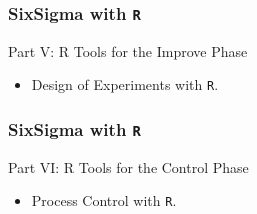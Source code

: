 \documentclass{beamer}
\begin{document}
\begin{frame}
\frametitle{SixSigma with \texttt{R}}
\Large
Part V: R Tools for the Improve Phase

\begin{itemize}
\item  Design of Experiments with \texttt{R}. 
\end{itemize}

\end{frame}
\begin{frame}
\frametitle{SixSigma with \texttt{R}}
\Large
Part VI: R Tools for the Control Phase

\begin{itemize}
\item  Process Control with \texttt{R}.
\end{itemize} 
\end{frame}
\end{document}
